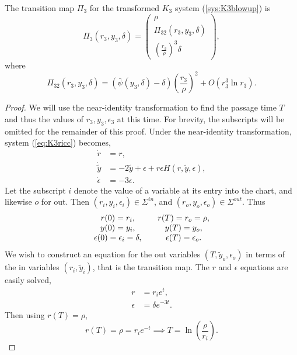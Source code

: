 \begin{prop}
	The transition map $\Pi_3$ for the transformed $K_3$ system (\ref{sys:K3blowup}) is
	$$ \Pi_3(r_3,y_3,\delta) = \begin{pmatrix}
	\rho \\ 
	\Pi_{32}(r_3,y_3,\delta) \\ 
	\left(\frac{r_3}{\rho}\right)^3\delta
	\end{pmatrix}, $$ 
	where $$\Pi_{32}(r_3,y_3,\delta)=\left(\bar{\psi}(y_3,\delta)-\delta\right)\left(\frac{r_3}{\rho}\right)^2 + O(r^3_3\ln r_3).$$
\end{prop}
\begin{proof}
	We will use the near-identity transformation to find the passage time $T$ and thus the values of $r_3,y_3,\epsilon_3$ at this time. For brevity, the subscripts will be omitted for the remainder of this proof. Under the near-identity transformation, system (\ref{eq:K3ricc}) becomes,
	\begin{subequations}
		\begin{align}
		\dot{r} &= r,\label{sys:K3riccNIr}\\
		\dot{\tilde{y}}&=-2\tilde{y}+\epsilon+r\epsilon H(r,\tilde{y},\epsilon)\label{sys:K3riccNIy},\\
		\dot{\epsilon} &= -3\epsilon.
		\label{sys:K3riccNIeps}
		\end{align}
	\end{subequations}
	Let the subscript $i$ denote the value of a variable at its entry into the chart, and likewise $o$ for out. Then $(r_i,y_i,\epsilon_i)\in \Sigma^{in}$, and $(r_o,y_o,\epsilon_o)\in \Sigma^{out}$. Thus 
	$$\begin{array}{c c c}
	r(0)=r_i, & &r(T)=r_o=\rho,\\
	y(0)=y_i, & &y(T)=y_o,\\
	\epsilon(0)=\epsilon_i=\delta,& & \epsilon(T)=\epsilon_o.
	\end{array}
	$$
	We wish to construct an equation for the out variables $(T,\tilde{y}_o,\epsilon_o)$ in terms of the in variables $ (r_i,\tilde{y}_i) $, that is the transition map. The $r$ and $\epsilon$ equations are easily solved,
	\begin{align}
	r&=r_ie^t, \\
	\epsilon&=\delta e^{-3t}.
	\end{align}
	Then using $r(T)=\rho$, 
	$$r(T)=\rho=r_ie^{-t} \implies T=\ln\left(\frac{\rho}{r_i}\right).$$
	

\end{proof}
